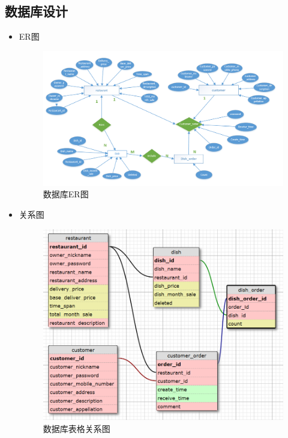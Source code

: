 \documentclass[12pt, oneside,a4paper]{article}
\begin{document}
\subsection{数据库设计}
\begin{itemize}
 \item ER图
  \begin{figure}[H]
   \centering
     \includegraphics[width=7.00in]{ER.png}
     \caption{\small{数据库ER图}}
  \end{figure}

 \item 关系图
  \begin{figure}[H]
    \centering
     \includegraphics[width=6.5in]{tables.png}
     \caption{\small{数据库表格关系图}}
  \end{figure}
\end{itemize}
\end{document}

